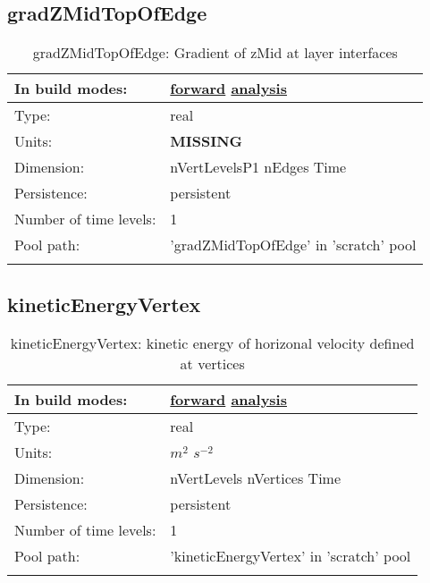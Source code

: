 \subsection[gradZMidTopOfEdge]{gradZMidTopOfEdge}
\label{subsec:var_sec_scratch_gradZMidTopOfEdge}
\begin{center}
\begin{longtable}{| p{2.0in} | p{4.0in} |}
        \hline 
        In build modes: & \hyperref[subsec:forward_var_tab_scratch]{forward} \hyperref[subsec:analysis_var_tab_scratch]{analysis} \\
        \hline 
        Type: & real \\
        \hline 
        Units: & {\bf \color{red} MISSING} \\
        \hline 
        Dimension: & nVertLevelsP1 nEdges Time \\
        \hline 
        Persistence: & persistent \\
        \hline 
        Number of time levels: & 1 \\
        \hline 
            Pool path: & 'gradZMidTopOfEdge' in 'scratch' pool
 \\
		 \hline 
    \caption{gradZMidTopOfEdge: Gradient of zMid at layer interfaces}
\end{longtable}
\end{center}
\subsection[kineticEnergyVertex]{kineticEnergyVertex}
\label{subsec:var_sec_scratch_kineticEnergyVertex}
\begin{center}
\begin{longtable}{| p{2.0in} | p{4.0in} |}
        \hline 
        In build modes: & \hyperref[subsec:forward_var_tab_scratch]{forward} \hyperref[subsec:analysis_var_tab_scratch]{analysis} \\
        \hline 
        Type: & real \\
        \hline 
        Units: & $m^2$ $s^{-2}$ \\
        \hline 
        Dimension: & nVertLevels nVertices Time \\
        \hline 
        Persistence: & persistent \\
        \hline 
        Number of time levels: & 1 \\
        \hline 
            Pool path: & 'kineticEnergyVertex' in 'scratch' pool
 \\
		 \hline 
    \caption{kineticEnergyVertex: kinetic energy of horizonal velocity defined at vertices}
\end{longtable}
\end{center}
